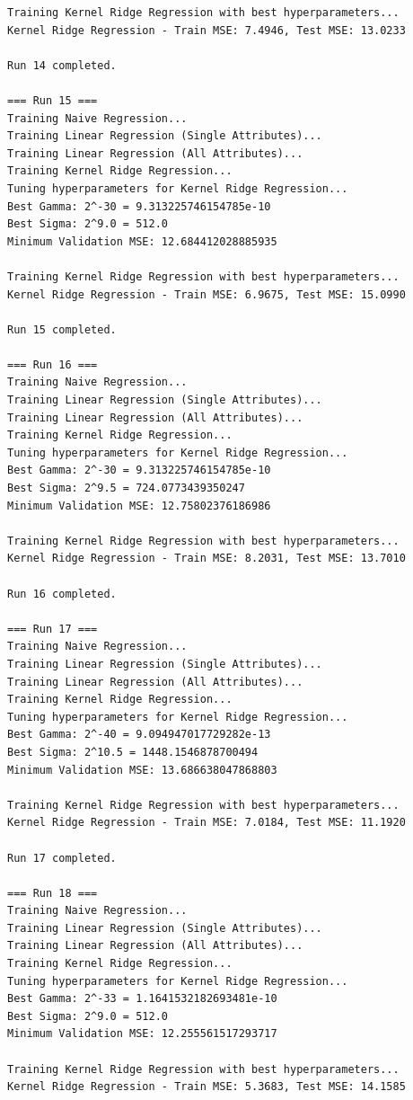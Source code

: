 \documentclass[final,3p,times,12pt]{article}
\begin{document}
\begin{verbatim}
Training Kernel Ridge Regression with best hyperparameters...
Kernel Ridge Regression - Train MSE: 7.4946, Test MSE: 13.0233

Run 14 completed.

=== Run 15 ===
Training Naive Regression...
Training Linear Regression (Single Attributes)...
Training Linear Regression (All Attributes)...
Training Kernel Ridge Regression...
Tuning hyperparameters for Kernel Ridge Regression...
Best Gamma: 2^-30 = 9.313225746154785e-10
Best Sigma: 2^9.0 = 512.0
Minimum Validation MSE: 12.684412028885935

Training Kernel Ridge Regression with best hyperparameters...
Kernel Ridge Regression - Train MSE: 6.9675, Test MSE: 15.0990

Run 15 completed.

=== Run 16 ===
Training Naive Regression...
Training Linear Regression (Single Attributes)...
Training Linear Regression (All Attributes)...
Training Kernel Ridge Regression...
Tuning hyperparameters for Kernel Ridge Regression...
Best Gamma: 2^-30 = 9.313225746154785e-10
Best Sigma: 2^9.5 = 724.0773439350247
Minimum Validation MSE: 12.75802376186986

Training Kernel Ridge Regression with best hyperparameters...
Kernel Ridge Regression - Train MSE: 8.2031, Test MSE: 13.7010

Run 16 completed.

=== Run 17 ===
Training Naive Regression...
Training Linear Regression (Single Attributes)...
Training Linear Regression (All Attributes)...
Training Kernel Ridge Regression...
Tuning hyperparameters for Kernel Ridge Regression...
Best Gamma: 2^-40 = 9.094947017729282e-13
Best Sigma: 2^10.5 = 1448.1546878700494
Minimum Validation MSE: 13.686638047868803

Training Kernel Ridge Regression with best hyperparameters...
Kernel Ridge Regression - Train MSE: 7.0184, Test MSE: 11.1920

Run 17 completed.

=== Run 18 ===
Training Naive Regression...
Training Linear Regression (Single Attributes)...
Training Linear Regression (All Attributes)...
Training Kernel Ridge Regression...
Tuning hyperparameters for Kernel Ridge Regression...
Best Gamma: 2^-33 = 1.1641532182693481e-10
Best Sigma: 2^9.0 = 512.0
Minimum Validation MSE: 12.255561517293717

Training Kernel Ridge Regression with best hyperparameters...
Kernel Ridge Regression - Train MSE: 5.3683, Test MSE: 14.1585


\end{verbatim}
\end{document}
